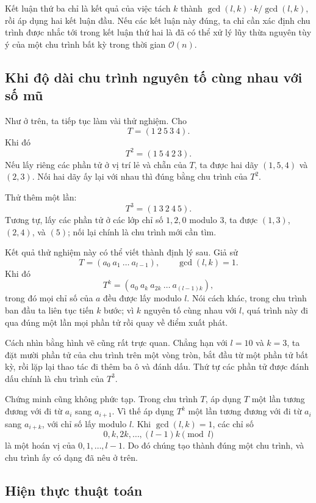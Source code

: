 \documentclass[11pt]{article}
\newcommand{\Oh}{\mathcal{O}}
\begin{document}
Kết luận thứ ba chỉ là kết quả của việc tách \(k\) thành
\(\gcd(l,k)\cdot k/\gcd(l,k)\), rồi áp dụng hai kết luận đầu. Nếu các kết luận
này đúng, ta chỉ cần xác định chu trình được nhắc tới trong kết luận thứ hai
là đã có thể xử lý lũy thừa nguyên tùy ý của một chu trình bất kỳ trong thời
gian \(\Oh(n)\).

\subsection{Khi độ dài chu trình nguyên tố cùng nhau với số mũ}

Như ở trên, ta tiếp tục làm vài thử nghiệm. Cho
\[
  T=(1\ 2\ 5\ 3\ 4).
\]
Khi đó
\[
  T^2=(1\ 5\ 4\ 2\ 3).
\]
Nếu lấy riêng các phần tử ở vị trí lẻ và chẵn của \(T\), ta được hai dãy
\((1,5,4)\) và \((2,3)\). Nối hai dãy ấy lại với nhau thì đúng bằng chu trình
của \(T^2\).

Thử thêm một lần:
\[
  T^3=(1\ 3\ 2\ 4\ 5).
\]
Tương tự, lấy các phần tử ở các lớp chỉ số \(1,2,0\) modulo \(3\), ta được
\((1,3)\), \((2,4)\), và \((5)\); nối lại chính là chu trình mới cần tìm.

Kết quả thử nghiệm này có thể viết thành định lý sau. Giả sử
\[
  T=(a_0\ a_1\ \ldots\ a_{l-1}),\qquad \gcd(l,k)=1.
\]
Khi đó
\[
  T^k=(a_0\ a_k\ a_{2k}\ \ldots\ a_{(l-1)k}),
\]
trong đó mọi chỉ số của \(a\) đều được lấy modulo \(l\). Nói cách khác, trong
chu trình ban đầu ta liên tục tiến \(k\) bước; vì \(k\) nguyên tố cùng nhau với
\(l\), quá trình này đi qua đúng một lần mọi phần tử rồi quay về điểm xuất
phát.

Cách nhìn bằng hình vẽ cũng rất trực quan. Chẳng hạn với \(l=10\) và \(k=3\),
ta đặt mười phần tử của chu trình trên một vòng tròn, bắt đầu từ một phần tử
bất kỳ, rồi lặp lại thao tác đi thêm ba ô và đánh dấu. Thứ tự các phần tử được
đánh dấu chính là chu trình của \(T^3\).

Chứng minh cũng không phức tạp. Trong chu trình \(T\), áp dụng \(T\) một lần
tương đương với đi từ \(a_i\) sang \(a_{i+1}\). Vì thế áp dụng \(T^k\) một lần
tương đương với đi từ \(a_i\) sang \(a_{i+k}\), với chỉ số lấy modulo \(l\).
Khi \(\gcd(l,k)=1\), các chỉ số
\[
  0,k,2k,\ldots,(l-1)k \pmod l
\]
là một hoán vị của \(0,1,\ldots,l-1\). Do đó chúng tạo thành đúng một chu
trình, và chu trình ấy có dạng đã nêu ở trên.

\subsection{Hiện thực thuật toán}
\end{document}
